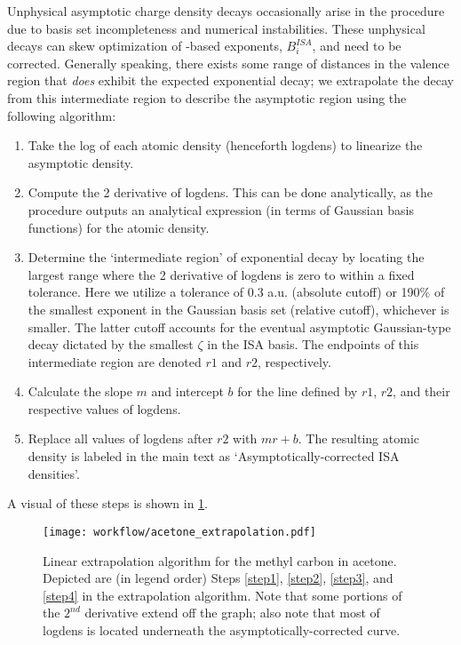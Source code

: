 
Unphysical asymptotic charge density decays occasionally arise in the
\isa 
procedure due to basis set incompleteness and numerical instabilities. These
unphysical decays can
skew optimization of \isa-based exponents, $B_i^{ISA}$, and need to be corrected.
Generally speaking, there exists some range of distances in the valence region
that \emph{does} exhibit the expected exponential decay; we extrapolate the
decay from this intermediate region to describe the asymptotic region using
the following algorithm:

\begin{enumerate}

\item Take the log of each atomic density (henceforth logdens) to linearize
the asymptotic density.
\label{step1}
\item Compute the 2 derivative of logdens. This can be
done analytically, as the \isa procedure outputs an analytical expression (in
terms of Gaussian basis functions) for the atomic density.
\label{step2}
\item Determine the `intermediate region' of exponential decay by locating the
largest range where the 2 derivative of logdens is zero
to within a fixed tolerance.  Here we utilize a tolerance of 0.3 a.u. (absolute cutoff)
or 190\% of the smallest exponent in the Gaussian basis set (relative cutoff),
whichever is smaller.  
The latter cutoff accounts for the eventual asymptotic Gaussian-type decay
dictated by the smallest $\zeta$ in the ISA basis.
The endpoints of this intermediate region are denoted $r1$ and $r2$, respectively.
\item Calculate the slope $m$ and intercept $b$ for the line defined by
$r1$, $r2$, and their respective values of logdens. 
\label{step3}
\item Replace all values of logdens after $r2$ with $mr + b$.  The resulting
atomic density is labeled in the main text as `Asymptotically-corrected ISA
densities'.
\label{step4}

\end{enumerate}

A visual of these steps is shown in \ref{fig:acetone-extrapolation}.


    \begin{figure}
    \texttt{[image: workflow/acetone\_extrapolation.pdf]}
    \caption{
        Linear extrapolation algorithm for the methyl carbon in acetone.
Depicted are (in legend order) Steps \ref{step1}, \ref{step2}, \ref{step3},
and \ref{step4} in the extrapolation algorithm. Note that some portions of the
$2^{nd}$ derivative extend off the graph; also note that most of logdens
is located underneath the asymptotically-corrected curve.
           		  }
    \label{fig:acetone-extrapolation}        
    \end{figure}




